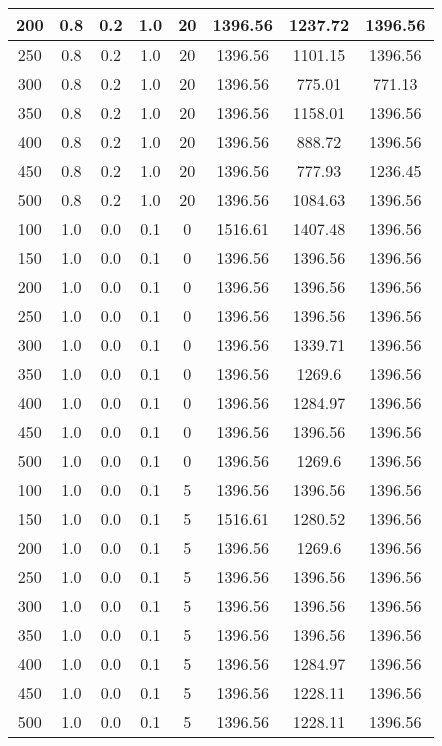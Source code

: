 \documentclass[a4paper, 12pt]{extreport}
\begin{document}
\begin{itemize}
\begin{longtable}{|c|c|c|c|c|c|c|c|}
			200 & 0.8 & 0.2 & 1.0 & 20 & 1396.56 & 1237.72 & 1396.56 \\\hline
			250 & 0.8 & 0.2 & 1.0 & 20 & 1396.56 & 1101.15 & 1396.56 \\\hline
			300 & 0.8 & 0.2 & 1.0 & 20 & 1396.56 & 775.01 & 771.13 \\\hline
			350 & 0.8 & 0.2 & 1.0 & 20 & 1396.56 & 1158.01 & 1396.56 \\\hline
			400 & 0.8 & 0.2 & 1.0 & 20 & 1396.56 & 888.72 & 1396.56 \\\hline
			450 & 0.8 & 0.2 & 1.0 & 20 & 1396.56 & 777.93 & 1236.45 \\\hline
			500 & 0.8 & 0.2 & 1.0 & 20 & 1396.56 & 1084.63 & 1396.56 \\\hline
			100 & 1.0 & 0.0 & 0.1 & 0 & 1516.61 & 1407.48 & 1396.56 \\\hline
			150 & 1.0 & 0.0 & 0.1 & 0 & 1396.56 & 1396.56 & 1396.56 \\\hline
			200 & 1.0 & 0.0 & 0.1 & 0 & 1396.56 & 1396.56 & 1396.56 \\\hline
			250 & 1.0 & 0.0 & 0.1 & 0 & 1396.56 & 1396.56 & 1396.56 \\\hline
			300 & 1.0 & 0.0 & 0.1 & 0 & 1396.56 & 1339.71 & 1396.56 \\\hline
			350 & 1.0 & 0.0 & 0.1 & 0 & 1396.56 & 1269.6 & 1396.56 \\\hline
			400 & 1.0 & 0.0 & 0.1 & 0 & 1396.56 & 1284.97 & 1396.56 \\\hline
			450 & 1.0 & 0.0 & 0.1 & 0 & 1396.56 & 1396.56 & 1396.56 \\\hline
			500 & 1.0 & 0.0 & 0.1 & 0 & 1396.56 & 1269.6 & 1396.56 \\\hline
			100 & 1.0 & 0.0 & 0.1 & 5 & 1396.56 & 1396.56 & 1396.56 \\\hline
			150 & 1.0 & 0.0 & 0.1 & 5 & 1516.61 & 1280.52 & 1396.56 \\\hline
			200 & 1.0 & 0.0 & 0.1 & 5 & 1396.56 & 1269.6 & 1396.56 \\\hline
			250 & 1.0 & 0.0 & 0.1 & 5 & 1396.56 & 1396.56 & 1396.56 \\\hline
			300 & 1.0 & 0.0 & 0.1 & 5 & 1396.56 & 1396.56 & 1396.56 \\\hline
			350 & 1.0 & 0.0 & 0.1 & 5 & 1396.56 & 1396.56 & 1396.56 \\\hline
			400 & 1.0 & 0.0 & 0.1 & 5 & 1396.56 & 1284.97 & 1396.56 \\\hline
			450 & 1.0 & 0.0 & 0.1 & 5 & 1396.56 & 1228.11 & 1396.56 \\\hline
			500 & 1.0 & 0.0 & 0.1 & 5 & 1396.56 & 1228.11 & 1396.56 \\\hline

\end{longtable}
\end{itemize}
\end{document}
